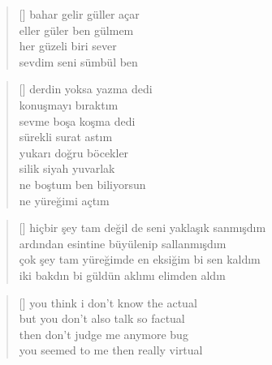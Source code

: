 \documentclass[10pt, openright, twoside]{memoir}
\theoremstyle{definition}
\begin{document}
\vspace*{\fill}
%
\newpage
{}
\vspace*{\fill}
\settowidth{\versewidth}{bahar gelir güller açar}
\begin{verse}[\versewidth]
  bahar gelir güller açar \\
  eller güler ben gülmem \\
  her güzeli biri sever \\
  sevdim seni sümbül ben
\end{verse}
\vspace*{\fill}
%
\newpage
{}
\vspace*{\fill}
\settowidth{\versewidth}{ne boştum ben biliyorsun}
\begin{verse}[\versewidth]
  derdin yoksa yazma dedi \\
  konuşmayı bıraktım \\
  sevme boşa koşma dedi \\
  sürekli surat astım \\
  yukarı doğru böcekler \\
  silik siyah yuvarlak \\
  ne boştum ben biliyorsun \\
  ne yüreğimi açtım
\end{verse}
\vspace*{\fill}
%
\newpage
{}
\vspace*{\fill}
\settowidth{\versewidth}{hiçbir şey tam değil de seni yaklaşık sanmışdım}
\begin{verse}[\versewidth]
  hiçbir şey tam değil de seni yaklaşık sanmışdım \\
  ardından esintine büyülenip sallanmışdım \\
  çok şey tam yüreğimde en eksiğim bi sen kaldım \\
  iki bakdın bi güldün aklımı elimden aldın
\end{verse}
\vspace*{\fill}
%
\newpage
{}
\vspace*{\fill}
\settowidth{\versewidth}{you seemed to me then really virtual}
\begin{verse}[\versewidth]
  you think i don't know the actual \\
  but you don't also talk so factual \\
  then don't judge me anymore bug \\
  you seemed to me then really virtual
\end{verse}
\end{document}
